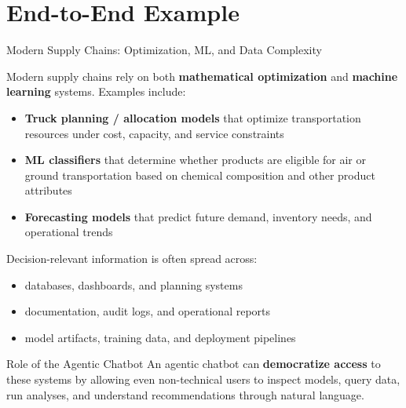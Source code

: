 \section{End-to-End Example}

\begin{frame}{Modern Supply Chains: Optimization, ML, and Data Complexity}

Modern supply chains rely on both \textbf{mathematical optimization} and \textbf{machine learning} systems. Examples include:
\begin{itemize}
  \item \textbf{Truck planning / allocation models} that optimize transportation resources under cost, capacity, and service constraints
  \item \textbf{ML classifiers} that determine whether products are eligible for air or ground transportation based on chemical composition and other product attributes
  \item \textbf{Forecasting models} that predict future demand, inventory needs, and operational trends
\end{itemize}

Decision-relevant information is often spread across:
\begin{itemize}
  \item databases, dashboards, and planning systems
  \item documentation, audit logs, and operational reports
  \item model artifacts, training data, and deployment pipelines
\end{itemize}

\begin{block}{Role of the Agentic Chatbot}
An agentic chatbot can \textbf{democratize access} to these systems by allowing even non-technical users to inspect models, query data, run analyses, and understand recommendations through natural language.
\end{block}

\end{frame}


